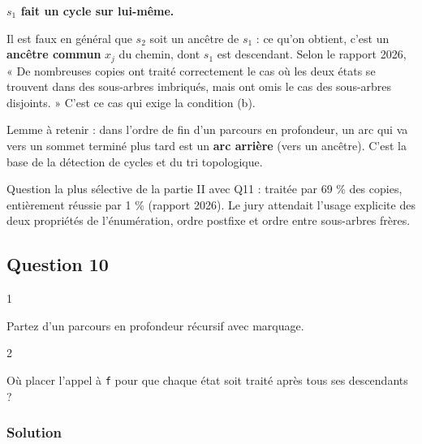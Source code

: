 \documentclass[11pt,a4paper]{article}
\begin{document}
\textbf{\(s_1\) fait un cycle sur lui-même.}

\begin{piege}

Il est faux en général que \(s_2\) soit un ancêtre de \(s_1\) : ce qu'on obtient, c'est un \textbf{ancêtre commun} \(x_j\) du chemin, dont \(s_1\) est descendant. Selon le rapport 2026, « De nombreuses copies ont traité correctement le cas où les deux états se trouvent dans des sous-arbres imbriqués, mais ont omis le cas des sous-arbres disjoints. » C'est ce cas qui exige la condition (b).

\end{piege}

\begin{methode}

Lemme à retenir : dans l'ordre de fin d'un parcours en profondeur, un arc qui va vers un sommet terminé plus tard est un \textbf{arc arrière} (vers un ancêtre). C'est la base de la détection de cycles et du tri topologique.

\end{methode}

\begin{jury}

Question la plus sélective de la partie II avec Q11 : traitée par 69 \% des copies, entièrement réussie par 1 \% (rapport 2026). Le jury attendait l'usage explicite des deux propriétés de l'énumération, ordre postfixe et ordre entre sous-arbres frères.

\end{jury}

\hypertarget{question-10}{%
\subsection{Question 10}\label{question-10}}

\begin{indication}{1}

Partez d'un parcours en profondeur récursif avec marquage.

\end{indication}

\begin{indication}{2}

Où placer l'appel à \texttt{f} pour que chaque état soit traité après tous ses descendants ?

\end{indication}

\hypertarget{solution-9}{%
\subsubsection{Solution}\label{solution-9}}
\end{document}

